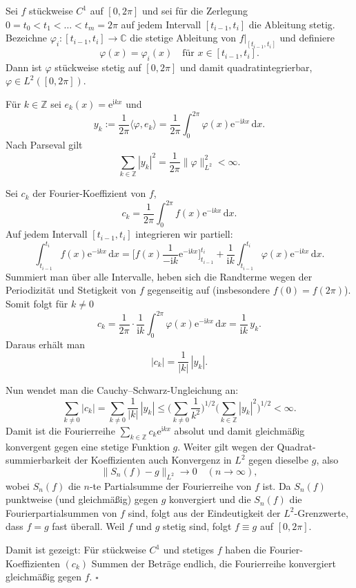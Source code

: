 \begin{beweisbox}
    Sei $f$ stückweise $C^1$ auf $[0,2\pi]$ und sei für die Zerlegung 
    $0=t_0<t_1<\dots<t_m=2\pi$ auf jedem Intervall $[t_{i-1},t_i]$ die Ableitung 
    stetig. Bezeichne $ \varphi_i:[t_{i-1},t_i]\to\mathbb C$ die stetige Ableitung von $f|_{[t_{i-1},t_i]}$ und definiere
    $$
    \varphi(x)=\varphi_i(x)\quad\text{für }x\in[t_{i-1},t_i].
    $$
    Dann ist $\varphi$ stückweise stetig auf $[0,2\pi]$ und damit quadratintegrierbar, $\varphi\in L^2([0,2\pi])$.

    Für $k\in\mathbb Z$ sei $e_k(x)=\mathrm e^{\mathrm i k x}$ und
    $$
    y_k:=\frac{1}{2\pi}\langle \varphi,e_k\rangle=\frac{1}{2\pi}\int_0^{2\pi}\varphi(x)\mathrm e^{-\mathrm i k x}\,\mathrm dx.
    $$
    Nach Parseval gilt
    $$
    \sum_{k\in\mathbb Z}|y_k|^2=\frac{1}{2\pi}\|\varphi\|_{L^2}^2<\infty.
    $$

    Sei $c_k$ der Fourier-Koeffizient von $f$,
    $$
    c_k=\frac{1}{2\pi}\int_0^{2\pi} f(x)\mathrm e^{-\mathrm i k x}\,\mathrm dx.
    $$
    Auf jedem Intervall $[t_{i-1},t_i]$ integrieren wir partiell:
    $$
    \int_{t_{i-1}}^{t_i} f(x)\mathrm e^{-\mathrm i k x}\,\mathrm dx
    = \Big[ f(x)\frac{1}{-\mathrm i k}\mathrm e^{-\mathrm i k x}\Big]_{t_{i-1}}^{t_i}
    + \frac{1}{\mathrm i k}\int_{t_{i-1}}^{t_i}\varphi(x)\mathrm e^{-\mathrm i k x}\,\mathrm dx.
    $$
    Summiert man über alle Intervalle, heben sich die Randterme wegen der Periodizität und Stetigkeit von $f$ gegenseitig auf (insbesondere $f(0)=f(2\pi)$). Somit folgt für $k\neq0$
    $$
    c_k=\frac{1}{2\pi}\cdot\frac{1}{\mathrm i k}\int_0^{2\pi}\varphi(x)\mathrm e^{-\mathrm i k x}\,\mathrm dx
    =\frac{1}{\mathrm i k}\,y_k.
    $$
    Daraus erhält man
    $$
    |c_k|=\frac{1}{|k|}\,|y_k|.
    $$

    Nun wendet man die Cauchy–Schwarz-Ungleichung an:
    $$
    \sum_{k\neq0}|c_k|=\sum_{k\neq0}\frac{1}{|k|}\,|y_k|
    \le\Big(\sum_{k\neq0}\frac{1}{k^2}\Big)^{1/2}\Big(\sum_{k\in\mathbb Z}|y_k|^2\Big)^{1/2}<\infty.
    $$
    Damit ist die Fourierreihe $\sum_{k\in\mathbb Z} c_k\mathrm e^{\mathrm i k x}$ absolut und damit gleichmäßig konvergent gegen eine stetige Funktion $g$. Weiter gilt wegen der Quadrat-summierbarkeit der Koeffizienten auch Konvergenz in $L^2$ gegen dieselbe $g$, also
    $$
    \|S_n(f)-g\|_{L^2}\to0\quad(n\to\infty),
    $$
    wobei $S_n(f)$ die $n$-te Partialsumme der Fourierreihe von $f$ ist. Da $S_n(f)$ punktweise (und gleichmäßig) gegen $g$ konvergiert und die $S_n(f)$ die Fourierpartialsummen von $f$ sind, folgt aus der Eindeutigkeit der $L^2$-Grenzwerte, dass $f=g$ fast überall. Weil $f$ und $g$ stetig sind, folgt $f\equiv g$ auf $[0,2\pi]$.

    Damit ist gezeigt: Für stückweise $C^1$ und stetiges $f$ haben die Fourier-Koeffizienten $(c_k)$ Summen der Beträge endlich, die Fourierreihe konvergiert gleichmäßig gegen $f$. $\square$
\end{beweisbox}

